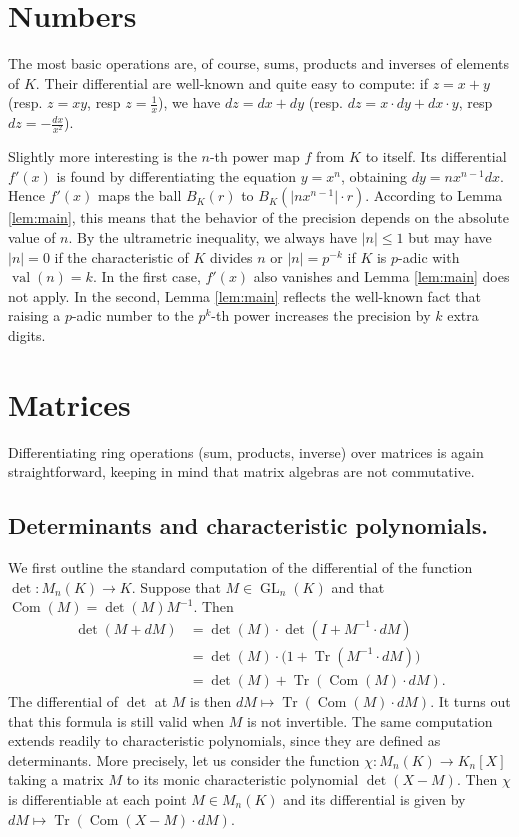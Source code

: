 \documentclass{sig-alternate}
\DeclareMathOperator{\GL}{GL}
\DeclareMathOperator{\val}{val}
\DeclareMathOperator{\tr}{Tr}
\DeclareMathOperator{\com}{Com}
\begin{document}
{\color{Bittersweet}

\section{Numbers}
\label{sec:numbers}

The most basic operations are, of course, sums, products and inverses of
elements of $K$. Their differential are well-known and quite easy to
compute: if $z = x + y$ (resp. $z = xy$, resp $z = \frac 1 x$), we have
$dz = dx + dy$ (resp. $dz = x \cdot dy + dx \cdot y$, resp $dz = -
\frac{dx}{x^2}$).

Slightly more interesting is the $n$-th power map $f$ from $K$ to
itself. Its differential $f'(x)$ is found by differentiating the
equation $y = x^n$, obtaining $dy = n x^{n-1} dx$.
Hence $f'(x)$ maps the ball $B_K(r)$ to $B_K(\lvert nx^{n-1} \rvert \cdot r)$. According to Lemma \ref{lem:main}, this
means that the behavior of the precision depends on the absolute value
of $n$. By the ultrametric inequality, we always have $\lvert n \rvert \leq 1$ but
may have $\lvert n \rvert = 0$ if the characteristic of $K$ divides $n$ or
$\lvert n \rvert = p^{-k}$ if $K$ is $p$-adic with $\val(n) = k$.  In the first case,
$f'(x)$ also vanishes and Lemma \ref{lem:main} does
not apply.  In the second, Lemma \ref{lem:main} reflects the well-known fact that
raising a $p$-adic number to the $p^k$-th power increases the precision
by $k$ extra digits.

\section{Matrices}
\label{sec:matrices}

Differentiating ring operations (sum, products, inverse) over matrices 
is again straightforward, keeping in mind that matrix algebras are not
commutative.

\subsection*{Determinants and characteristic polynomials.}

We first outline the standard computation of the differential of the function
$\det : M_n(K) \to K$. Suppose that $M \in \GL_n(K)$ and that $\com(M) = \det(M) M^{-1}$.
Then
\begin{align*}
\det(M + dM) &= \det(M) \cdot \det(I + M^{-1} \cdot dM)  \\
&= \det(M) \cdot \big(1 + \tr(M^{-1} \cdot dM)\big) \\
&= \det(M) + \tr(\com(M) \cdot dM).
\end{align*}
The differential of $\det$ at $M$ is then $dM \mapsto \tr(\com(M) \cdot dM)$. It turns
out that this formula is still valid when $M$ is not invertible.
The same computation extends readily to characteristic polynomials,
since they are defined as determinants. More precisely, let us 
consider the function $\chi : M_n(K) \to K_n[X]$ taking a matrix 
$M$ to its monic characteristic polynomial $\det(X-M)$.
Then $\chi$ is differentiable at each point $M \in M_n(K)$ and its 
differential is given by $dM \mapsto \tr(\com(X{-}M) \cdot dM)$.

}
\end{document}
